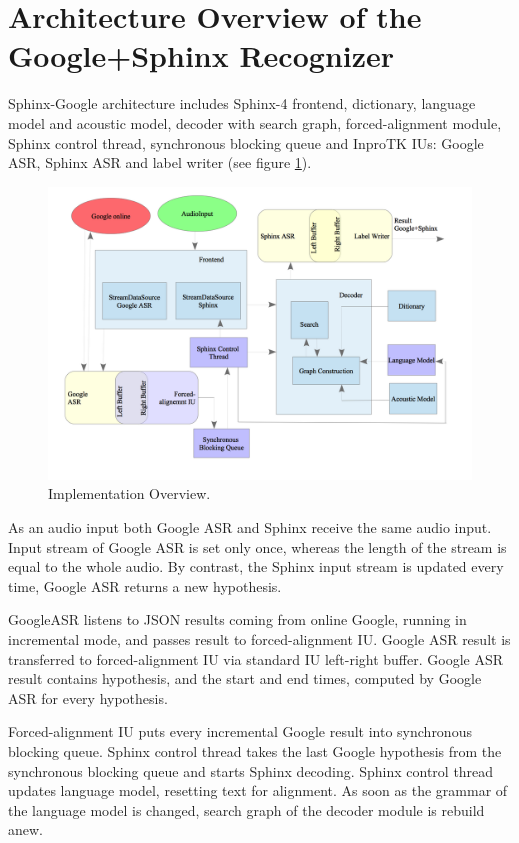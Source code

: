 \section {Architecture Overview of the Google+Sphinx Recognizer}
Sphinx-Google architecture includes Sphinx-4 frontend, dictionary,
language model and acoustic model, decoder with search graph, forced-alignment
module, Sphinx control thread, synchronous blocking queue and InproTK IUs:
Google ASR, Sphinx ASR and label writer (see figure \ref {fig:arch}).
\begin{figure}[htbp]
  \centering
    \includegraphics[width=1\textwidth]{images/architecture.png}
 \caption{Implementation Overview.}
  \label{fig:arch}
\end {figure} 

As an audio input both Google ASR and Sphinx receive the same audio input.
Input stream of Google ASR is set only once, whereas the length of
the stream is equal to the whole audio. By contrast, the Sphinx input stream is
updated every time, Google ASR returns a new hypothesis.  


GoogleASR listens to JSON results coming from online Google, running
in incremental mode, and passes result to forced-alignment IU. Google ASR result
is transferred to forced-alignment IU via standard IU left-right buffer. Google
ASR result contains hypothesis, and the start and end times, computed by Google
ASR for every hypothesis. 

Forced-alignment IU puts every incremental Google result into synchronous
blocking queue. Sphinx control thread takes the last Google hypothesis from the
synchronous blocking queue and starts Sphinx decoding. Sphinx control thread
updates language model, resetting text for alignment. As soon as the grammar of
the language model is changed, search graph of the decoder module is rebuild
anew. 


